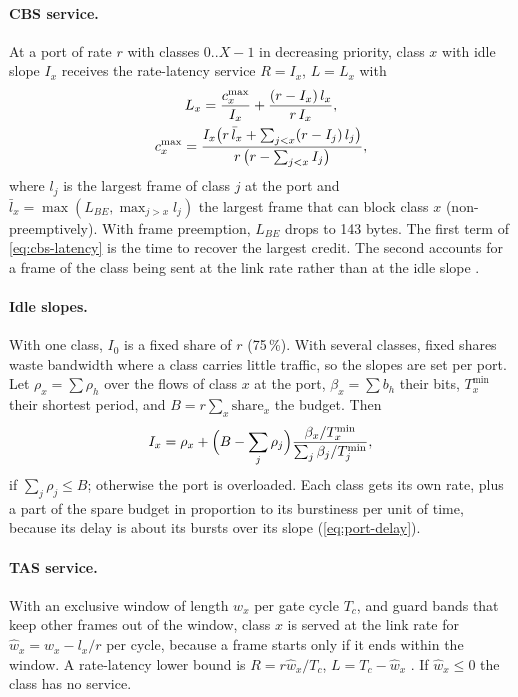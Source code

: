 \paragraph{CBS service.} At a port of rate $r$ with classes $0..X-1$ in
decreasing priority, class $x$ with idle slope $I_x$ receives the
rate-latency service $R=I_x$, $L=L_x$ with
\cite{mohammadpour2018latency,zhao2021latency}
\begin{gather}
L_x=\frac{c^{\max}_x}{I_x}+\frac{(r-I_x)\,l_x}{r\,I_x},\label{eq:cbs-latency}\\
c^{\max}_x=\frac{I_x\bigl(r\,\bar l_x+\sum_{j<x}(r-I_j)\,l_j\bigr)}
	{r\,\bigl(r-\sum_{j<x}I_j\bigr)},\label{eq:cbs-credit}
\end{gather}
where $l_j$ is the largest frame of class $j$ at the port and $\bar l_x=
\max(L_{BE},\max_{j>x}l_j)$ the largest frame that can block class $x$
(non-preemptively). With frame preemption, $L_{BE}$ drops to 143 bytes.
The first term of \cref{eq:cbs-latency} is the time to recover the largest
credit. The second accounts for a frame of the class being sent at the
link rate rather than at the idle slope \cite{azua2014complete}.

\paragraph{Idle slopes.} With one class, $I_0$ is a fixed share of $r$
(75\,\%). With several classes, fixed shares waste bandwidth where a class
carries little traffic, so the slopes are set per port. Let $\rho_x=\sum
\rho_h$ over the flows of class $x$ at the port, $\beta_x=\sum b_h$ their
bits, $T^{\min}_x$ their shortest period, and $B=r\sum_x\mathrm{share}_x$
the budget. Then
\begin{equation}
I_x=\rho_x+\Bigl(B-\sum_j\rho_j\Bigr)\frac{\beta_x/T^{\min}_x}
	{\sum_j\beta_j/T^{\min}_j},
\label{eq:slopes}
\end{equation}
if $\sum_j\rho_j\le B$; otherwise the port is overloaded. Each class gets
its own rate, plus a part of the spare budget in proportion to its
burstiness per unit of time, because its delay is about its bursts over
its slope (\cref{eq:port-delay}).

\paragraph{TAS service.} With an exclusive window of length $w_x$ per
gate cycle $T_c$, and guard bands that keep other frames out of the
window, class $x$ is served at the link rate for $\hat w_x=w_x-l_x/r$ per cycle,
because a frame starts only if it ends within the window. A rate-latency
lower bound is $R=r\hat w_x/T_c$, $L=T_c-\hat w_x$ \cite{zhao2018worst}. If $\hat w_x\le0$
the class has no service.

